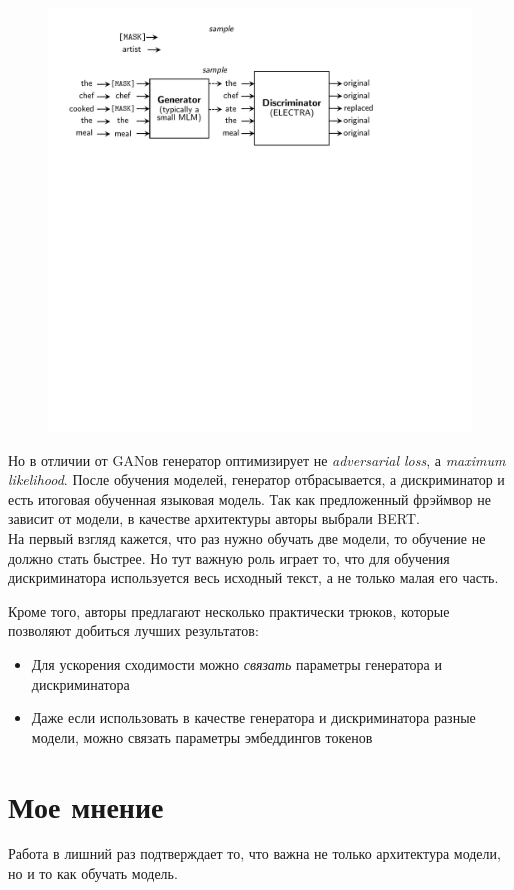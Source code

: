 \begin{figure}[ht]
  \centering
  \includegraphics[width=0.8\linewidth]{figures/electra.pdf}
  \caption{}
  \label{fig:electra}
\end{figure}

Но в отличии от GANов генератор оптимизирует не \textit{adversarial loss}, а \textit{maximum likelihood}. 
После обучения моделей, генератор отбрасывается, а дискриминатор и есть итоговая обученная языковая модель. 
Так как предложенный фрэймвор не зависит от модели, в качестве архитектуры авторы выбрали BERT. \\

На первый взгляд кажется, что раз нужно обучать две модели, то обучение не должно стать быстрее. 
Но тут важную роль играет то, что для обучения дискриминатора используется весь исходный текст, а не только малая его часть.

Кроме того, авторы предлагают несколько практически трюков, которые позволяют добиться лучших результатов:
\begin{itemize}
    \item Для ускорения сходимости можно \textit{связать} параметры генератора и дискриминатора
    \item Даже если использовать в качестве генератора и дискриминатора разные модели, можно связать параметры эмбеддингов токенов
\end{itemize}

\section*{Мое мнение}

Работа в лишний раз подтверждает то, что важна не только архитектура модели, но и то как обучать модель.